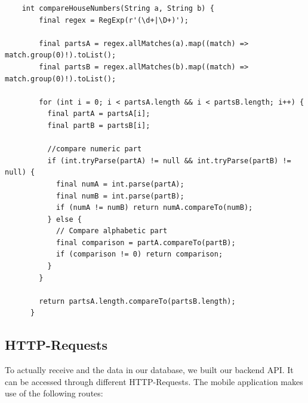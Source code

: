 \lstset{style=generic, caption=compareHouseNumbers function (AddressProvider.dart)}
\begin{lstlisting}
    int compareHouseNumbers(String a, String b) {
        final regex = RegExp(r'(\d+|\D+)');
    
        final partsA = regex.allMatches(a).map((match) => match.group(0)!).toList();
        final partsB = regex.allMatches(b).map((match) => match.group(0)!).toList();
    
        for (int i = 0; i < partsA.length && i < partsB.length; i++) {
          final partA = partsA[i];
          final partB = partsB[i];
    
          //compare numeric part
          if (int.tryParse(partA) != null && int.tryParse(partB) != null) {
            final numA = int.parse(partA);
            final numB = int.parse(partB);
            if (numA != numB) return numA.compareTo(numB);
          } else {
            // Compare alphabetic part
            final comparison = partA.compareTo(partB);
            if (comparison != 0) return comparison;
          }
        }
    
        return partsA.length.compareTo(partsB.length);
      }
\end{lstlisting}

\subsection{HTTP-Requests}

To actually receive and the data in our database, we built our backend API. It can be accessed through different HTTP-Requests. The mobile application makes use of the following routes: 

